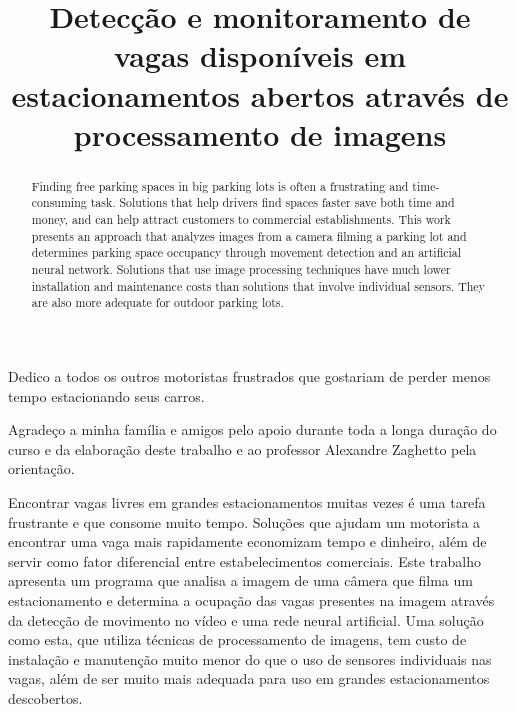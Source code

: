 \documentclass[bacharelado]{unb-cic}
\title{Detecção e monitoramento de vagas disponíveis em estacionamentos abertos através de processamento de imagens}
\begin{document}
  \maketitle
  \pretextual

  \begin{dedicatoria}
  Dedico a todos os outros motoristas frustrados que gostariam de perder menos tempo estacionando seus carros.
  \end{dedicatoria}

  \begin{agradecimentos}
  Agradeço a minha família e amigos pelo apoio durante toda a longa duração do curso e da elaboração deste trabalho e ao professor Alexandre Zaghetto pela orientação.
  \end{agradecimentos}

  \begin{resumo}
  Encontrar vagas livres em grandes estacionamentos muitas vezes é uma tarefa frustrante e que consome muito tempo. Soluções que ajudam um motorista a encontrar uma vaga mais rapidamente economizam tempo e dinheiro, além de servir como fator diferencial entre estabelecimentos comerciais. Este trabalho apresenta um programa que analisa a imagem de uma câmera que filma um estacionamento e determina a ocupação das vagas presentes na imagem através da detecção de movimento no vídeo e uma rede neural artificial. Uma solução como esta, que utiliza técnicas de processamento de imagens, tem custo de instalação e manutenção muito menor do que o uso de sensores individuais nas vagas, além de ser muito mais adequada para uso em grandes estacionamentos descobertos.
  \end{resumo}

  \begin{abstract}
  Finding free parking spaces in big parking lots is often a frustrating and time-consuming task. Solutions that help drivers find spaces faster save both time and money, and can help attract customers to commercial establishments. This work presents an approach that analyzes images from a camera filming a parking lot and determines parking space occupancy through movement detection and an artificial neural network. Solutions that use image processing techniques have much lower installation and maintenance costs than solutions that involve individual sensors. They are also more adequate for outdoor parking lots.
  \end{abstract}

  \tableofcontents
  \listoffigures
  \listoftables

  \textual
  
	
	
	
	
  

  \postextual
  
  
\end{document}
